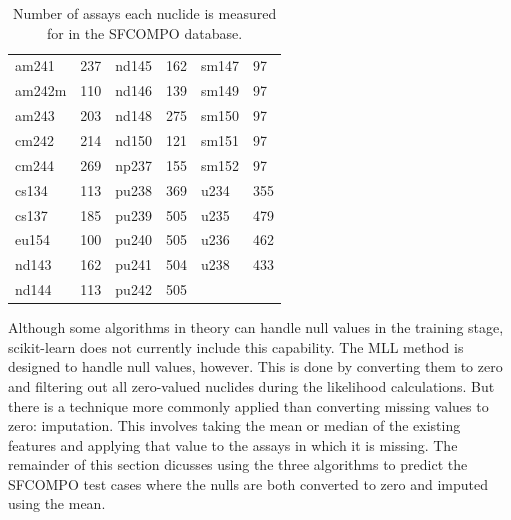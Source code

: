 \begin{table}[!htb]
  \centering
  \begin{tabular}{>{\raggedleft}m{0.6in}
                                m{0.4in}
                  >{\raggedleft}m{0.6in}
                                m{0.4in}
                  >{\raggedleft}m{0.6in}
                                m{0.4in}}
    \toprule
    \rowcolor[gray]{0.88} am241  & 237 & nd145 & 162 & sm147 & 97  \\  
    \rowcolor[gray]{0.95} am242m & 110 & nd146 & 139 & sm149 & 97  \\ 
    \rowcolor[gray]{0.88} am243  & 203 & nd148 & 275 & sm150 & 97  \\ 
    \rowcolor[gray]{0.95} cm242  & 214 & nd150 & 121 & sm151 & 97  \\ 
    \rowcolor[gray]{0.88} cm244  & 269 & np237 & 155 & sm152 & 97  \\ 
    \rowcolor[gray]{0.95} cs134  & 113 & pu238 & 369 & u234  & 355 \\ 
    \rowcolor[gray]{0.88} cs137  & 185 & pu239 & 505 & u235  & 479 \\ 
    \rowcolor[gray]{0.95} eu154  & 100 & pu240 & 505 & u236  & 462 \\ 
    \rowcolor[gray]{0.88} nd143  & 162 & pu241 & 504 & u238  & 433 \\ 
    \rowcolor[gray]{0.95} nd144  & 113 & pu242 & 505 &       &     \\ \bottomrule
  \end{tabular}
  \caption{Number of assays each nuclide is measured for in the \gls{SFCOMPO}
           database.}
  \label{tbl:missing}
\end{table}

Although some algorithms in theory can handle null values in the training
stage, scikit-learn does not currently include this capability. The \gls{MLL}
method is designed to handle null values, however. This is done by converting
them to zero and filtering out all zero-valued nuclides during the likelihood
calculations. But there is a technique more commonly applied than converting
missing values to zero: imputation. This involves taking the mean or median of
the existing features and applying that value to the assays in which it is
missing.  The remainder of this section dicusses using the three algorithms to
predict the \gls{SFCOMPO} test cases where the nulls are both converted to zero
and imputed using the mean.  

